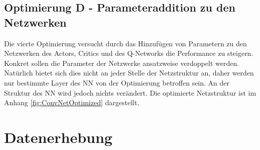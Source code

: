 \subsection{Optimierung D - Parameteraddition zu den Netzwerken} \label{sec:Konzept_Optimierung04}
Die vierte Optimierung versucht durch das Hinzufügen von Parametern zu den Netzwerken des Actors, Critics und des Q-Networks die Performance zu steigern. Konkret sollen die Parameter der Netzwerke ansatzweise verdoppelt werden. Natürlich bietet sich dies nicht an jeder Stelle der Netzstruktur an, daher werden nur bestimmte Layer des NN von der Optimierung betroffen sein. An der Struktur des NN wird jedoch nichts verändert. Die optimierte Netzstruktur ist im Anhang \ref{fig:ConvNetOptimized} dargestellt. 

\section{Datenerhebung} \label{sec:Konzept_Datenerhebung}
